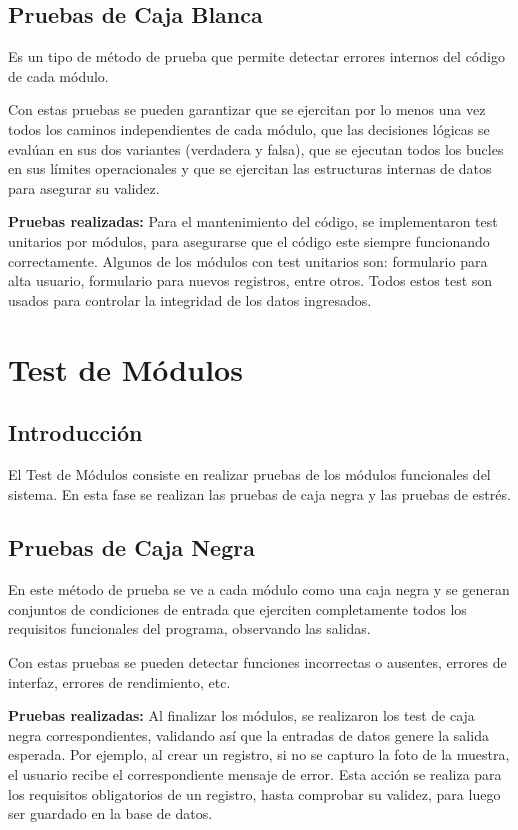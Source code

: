 	\subsection{Pruebas de Caja Blanca}
		Es un tipo de método de prueba que permite detectar errores internos del código de cada módulo. 

		Con estas pruebas se pueden garantizar que se ejercitan por lo menos una vez todos los caminos independientes de cada módulo, que las decisiones lógicas se evalúan en sus dos variantes (verdadera y falsa), que se ejecutan todos los bucles en sus límites operacionales y que se ejercitan las estructuras internas de datos para asegurar su validez.
		\newline

		\textbf{Pruebas realizadas:}
		Para el mantenimiento del código, se implementaron test unitarios por módulos, para asegurarse que el código este siempre funcionando correctamente. Algunos de los módulos con test unitarios son: formulario para alta usuario, formulario para nuevos registros, entre otros.
		Todos estos test son usados para controlar la integridad de los datos ingresados.

\section{Test de Módulos}

	\subsection{Introducción}
		El Test de Módulos consiste en realizar pruebas de los módulos funcionales del sistema. En esta fase se realizan las pruebas de caja negra y las pruebas de estrés. 

	\subsection{Pruebas de Caja Negra}

		En este método de prueba se ve a cada módulo como una caja negra y se generan conjuntos de condiciones de entrada que ejerciten completamente todos los requisitos funcionales del programa, observando las salidas.

		Con estas pruebas se pueden detectar funciones incorrectas o ausentes, errores de interfaz, errores de rendimiento, etc.
		\newline

		\textbf{Pruebas realizadas:}
		Al finalizar los módulos, se realizaron los test de caja negra correspondientes, validando así que la entradas de datos genere la salida esperada.
		Por ejemplo, al crear un registro, si no se capturo la foto de la muestra, el usuario recibe el correspondiente mensaje de error. Esta acción se realiza para los requisitos obligatorios de un registro, hasta comprobar su validez, para luego ser guardado en la base de datos.
			
